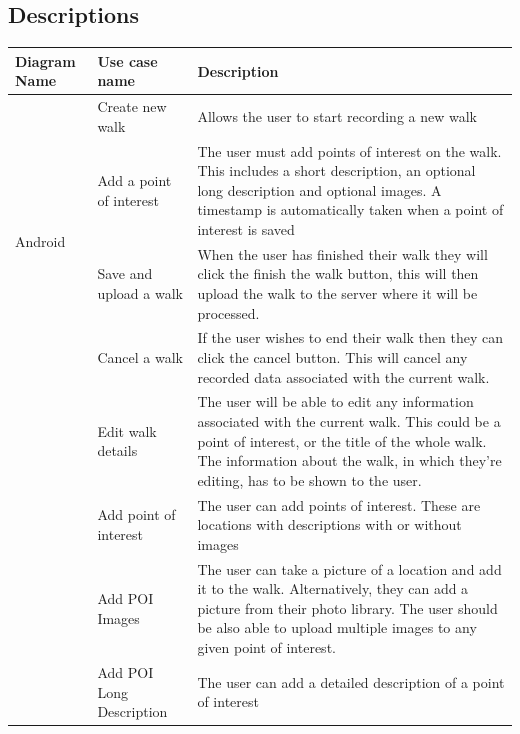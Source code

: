 \documentclass[12pt]{article}
\begin{document}
\subsection{Descriptions}
\clearpage
\setlength\LTleft{-1cm}
\begin{longtable}{|p{2cm}|p{3cm}|p{10cm}|}
\hline
	Diagram Name & Use case name  & Description \\
\hline

 \multirow{4}{*}{Android} & \multicolumn{1}{|p{3cm}|}{Create new walk} & \multicolumn{1}{|p{10cm}|}{Allows the user to start recording a new walk} \\\cline{2-3} & \multicolumn{1}{|p{3cm}|}{Add a point of interest
} & \multicolumn{1}{|p{10cm}|}{The user must add points of interest on the walk. This includes a short description, an optional long description and optional images. A timestamp is automatically taken when a point of interest is saved}
\\\cline{2-3} & \multicolumn{1}{|p{3cm}|}{Save and upload a walk} & \multicolumn{1}{|p{10cm}|}{When the user has finished their walk they will click the finish the walk button, this will then upload the walk to the server where it will be processed.}
\\\cline{2-3} & \multicolumn{1}{|p{3cm}|}{Cancel a walk} & \multicolumn{1}{|p{10cm}|}{If the user wishes to end their walk then they can click the cancel button. This will cancel any recorded data associated with the current walk.}
\\\cline{2-3} & \multicolumn{1}{|p{3cm}|}{Edit walk details} & \multicolumn{1}{|p{10cm}|}{The user will be able to edit any information associated with the current walk. This could be a point of interest, or the title of the whole walk. The information about the walk, in which they're editing, has to be shown to the user.}
\\\cline{2-3} & \multicolumn{1}{|p{3cm}|}{Add point of interest} & \multicolumn{1}{|p{10cm}|}{The user can add points of interest. These are locations with descriptions with or without images}
\\\cline{2-3} & \multicolumn{1}{|p{3cm}|}{Add POI Images} & \multicolumn{1}{|p{10cm}|}{The user can take a picture of a location and add it to the walk. Alternatively, they can add a picture from their photo library. The user should be also able to upload multiple images to any given point of interest.}
\\\cline{2-3} & \multicolumn{1}{|p{3cm}|}{Add POI Long Description} & \multicolumn{1}{|p{10cm}|}{The user can add a detailed description of a point of interest}

\end{longtable}
\end{document}
